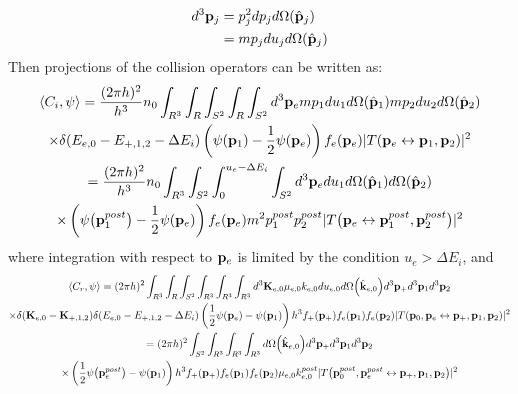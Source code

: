 \documentclass{article}[draft]
\begin{document}
\begin{align*}
d^3 \vect{p}_j
&= p_j^2 d p_j d \Omega\of{\hat{\vect{p}}_j} 
\\
&= m p_j d u_j d \Omega\of{\hat{\vect{p}}_j} 
\end{align*}
Then projections of the collision operators can be written as:
\begin{multline*}
\left< C_i, \psi \right> 
= \frac{(2\pi h)^2}{h^3}
n_0
\int_{R^3} \int_{R} \int_{S^2} \int_{R} \int_{S^2} 
d^3 \vect{p}_e
m p_1 d u_1 d\Omega\of{\hat{\vect{p}}_1} 
m p_2 d u_2 d\Omega\of{\hat{\vect{p}}_2} 
\\
\times 
\delta\of{E_{e,0} - E_{+,1,2} - \Delta E_i}
\left( \psi\of{\vect{p}_1}  
- \frac12 \psi\of{\vect{p}_e} \right) f_e\of{\vect{p}_e} 
| T\of{\vect{p}_e \leftrightarrow \vect{p}_1, \vect{p}_2} |^2
\\
= \frac{(2\pi h)^2}{h^3}
n_0
\int_{R^3} \int_{S^2} \int_{0}^{u_{e} - \Delta E_i} \int_{S^2} 
d^3 \vect{p}_e
d u_1 d\Omega\of{\hat{\vect{p}}_1} 
d\Omega\of{\hat{\vect{p}}_2} 
\\
\times
\left( \psi\of{\vect{p}_1^{post}}  
- \frac12 \psi\of{\vect{p}_e} \right) f_e\of{\vect{p}_e} 
m^2 p_1^{post} p_2^{post} | T\of{\vect{p}_e \leftrightarrow \vect{p}_1^{post}, \vect{p}_2^{post}} |^2
\end{multline*}
where integration with respect to $\mathbf{p}_e$ is limited by the condition $u_{e} > \Delta E_i$, and
\begin{multline*}
\left< C_r, \psi \right>  =
(2\pi h)^2 
\int_{R^3} \int_{R} \int_{S^2}
\int_{R^3} \int_{R^3} \int_{R^3} 
d^3 \vect{K}_{e,0} \mu_{e,0} k_{e,0} d u_{e,0} d \Omega\of{\hat{\vect{k}}_{e,0}}
d^3 \vect{p}_+ d^3 \vect{p}_1 d^3 \vect{p}_2 
\\
\times
\delta\of{\vect{K}_{e,0} - \vect{K}_{+,1,2}} 
\delta\of{E_{e,0} - E_{+,1,2} - \Delta E_i}
\left( \frac12 \psi\of{\vect{p}_e}
- \psi\of{\vect{p}_1} \right) h^3 f_+\of{\vect{p}_+} f_e\of{\vect{p}_1}  f_e\of{\vect{p}_2} 
| T\of{\vect{p}_0, \vect{p}_e \leftrightarrow \vect{p}_+, \vect{p}_1, \vect{p}_2} |^2
\\
=
(2\pi h)^2 
\int_{S^2} 
\int_{R^3} \int_{R^3} \int_{R^3} 
d \Omega\of{\hat{\vect{k}}_{e,0}}
d^3 \vect{p}_+ d^3 \vect{p}_1 d^3 \vect{p}_2 
\\
\times
\left( \frac12 \psi\of{\vect{p}_e^{post}}
- \psi\of{\vect{p}_1} \right) h^3 f_+\of{\vect{p}_+} f_e\of{\vect{p}_1}  f_e\of{\vect{p}_2} 
\mu_{e,0} k_{e,0}^{post} 
| T\of{\vect{p}_0^{post}, \vect{p}_e^{post} \leftrightarrow \vect{p}_+, \vect{p}_1, \vect{p}_2} |^2
\end{multline*}
\end{document}

